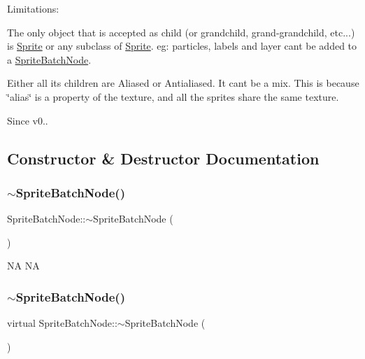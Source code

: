 Limitations\+:
\begin{DoxyItemize}
\item The only object that is accepted as child (or grandchild, grand-\/grandchild, etc...) is \hyperlink{classSprite}{Sprite} or any subclass of \hyperlink{classSprite}{Sprite}. eg\+: particles, labels and layer can\textquotesingle{}t be added to a \hyperlink{classSpriteBatchNode}{Sprite\+Batch\+Node}.
\item Either all its children are Aliased or Antialiased. It can\textquotesingle{}t be a mix. This is because \char`\"{}alias\char`\"{} is a property of the texture, and all the sprites share the same texture.
\end{DoxyItemize}

\begin{DoxySince}{Since}
v0.. 
\end{DoxySince}


\subsection{Constructor \& Destructor Documentation}
\mbox{\label{classSpriteBatchNode_a41036ad846110453c8936fdebbdf2833}} 
\subsubsection{\texorpdfstring{$\sim$\+Sprite\+Batch\+Node()}{~SpriteBatchNode()}\hspace{0.1cm}{\footnotesize\ttfamily [1/2]}}
{\footnotesize\ttfamily Sprite\+Batch\+Node\+::$\sim$\+Sprite\+Batch\+Node (\begin{DoxyParamCaption}{ }\end{DoxyParamCaption})\hspace{0.3cm}{\ttfamily [virtual]}}

NA  NA \mbox{\label{classSpriteBatchNode_a9d8d2cd94ab1a9c24e5df54b22f05350}} 
\subsubsection{\texorpdfstring{$\sim$\+Sprite\+Batch\+Node()}{~SpriteBatchNode()}\hspace{0.1cm}{\footnotesize\ttfamily [2/2]}}
{\footnotesize\ttfamily virtual Sprite\+Batch\+Node\+::$\sim$\+Sprite\+Batch\+Node (\begin{DoxyParamCaption}{ }\end{DoxyParamCaption})\hspace{0.3cm}{\ttfamily [virtual]}}

